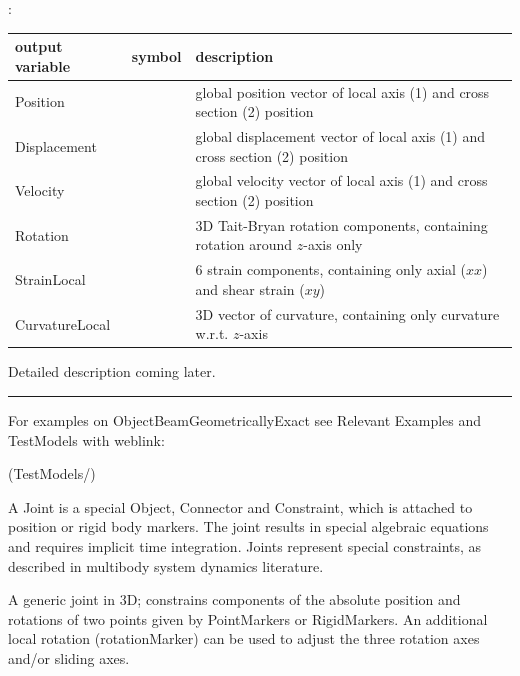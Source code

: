 :
\begin{center}
\footnotesize
\begin{longtable}{| p{5cm} | p{5cm} | p{6cm} |} 
\hline
\bf output variable & \bf symbol & \bf description \\ \hline
Position &  & global position vector of local axis (1) and cross section (2) position\\ \hline
Displacement &  & global displacement vector of local axis (1) and cross section (2) position\\ \hline
Velocity &  & global velocity vector of local axis (1) and cross section (2) position\\ \hline
Rotation &  & 3D Tait-Bryan rotation components, containing rotation around $z$-axis only\\ \hline
StrainLocal &  & 6 strain components, containing only axial ($xx$) and shear strain ($xy$)\\ \hline
CurvatureLocal &  & 3D vector of curvature, containing only curvature w.r.t. $z$-axis\\ \hline
\end{longtable}
\end{center}
 \noindent
    Detailed description coming later.
\vspace{6pt}\par\noindent\rule{\textwidth}{0.4pt}
%
\noindent For examples on ObjectBeamGeometricallyExact see Relevant Examples and TestModels with weblink:
\bi
\item {} (TestModels/)

\ei

%

\newpage
A Joint is a special Object, Connector and Constraint, which is attached to position or rigid body markers. The joint results in special algebraic equations and requires implicit time integration. Joints represent special constraints, as described in multibody system dynamics literature.


\label{sec:item:ObjectJointGeneric}
A generic joint in 3D; constrains components of the absolute position and rotations of two points given by PointMarkers or RigidMarkers. An additional local rotation (rotationMarker) can be used to adjust the three rotation axes and/or sliding axes.
\vspace{12pt}\\

